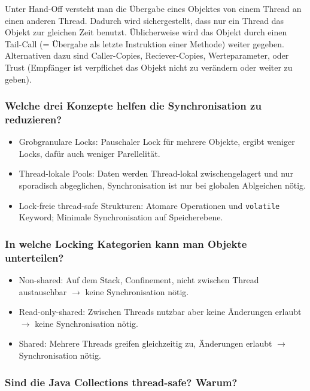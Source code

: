 \documentclass[10pt,a4paper]{scrartcl}
\begin{document}
Unter Hand-Off versteht man die Übergabe eines Objektes von einem Thread an einen anderen Thread.
Dadurch wird sichergestellt, dass nur ein Thread das Objekt zur gleichen Zeit benutzt.
Üblicherweise wird das Objekt durch einen Tail-Call (= Übergabe als letzte Instruktion einer
Methode) weiter gegeben. Alternativen dazu sind Caller-Copies, Reciever-Copies, Werteparameter,
oder Trust (Empfänger ist verpflichet das Objekt nicht zu verändern oder weiter zu geben).
  
\subsubsection{Welche drei Konzepte helfen die Synchronisation zu reduzieren?}

\begin{itemize}
	\item Grobgranulare Locks: Pauschaler Lock für mehrere Objekte, ergibt weniger Locks, dafür auch
		weniger Parellelität.
	\item Thread-lokale Pools: Daten werden Thread-lokal zwischengelagert und nur sporadisch
		abgeglichen, Synchronisation ist nur bei globalen Ablgeichen nötig.
	\item Lock-freie thread-safe Strukturen: Atomare Operationen und \texttt{volatile} Keyword;
		Minimale Synchronisation auf Speicherebene.
\end{itemize}
  
\subsubsection{In welche Locking Kategorien kann man Objekte unterteilen?}
 
\begin{itemize}
	\item Non-shared: Auf dem Stack, Confinement, nicht zwischen Thread austauschbar $\rightarrow$ keine Synchronisation nötig.
	\item Read-only-shared: Zwischen Threads nutzbar aber keine Änderungen erlaubt $\rightarrow$ keine Synchronisation nötig.
	\item Shared: Mehrere Threads greifen gleichzeitig zu, Änderungen erlaubt $\rightarrow$ Synchronisation nötig.
\end{itemize}

\subsubsection{Sind die Java Collections thread-safe? Warum?}
\end{document}
